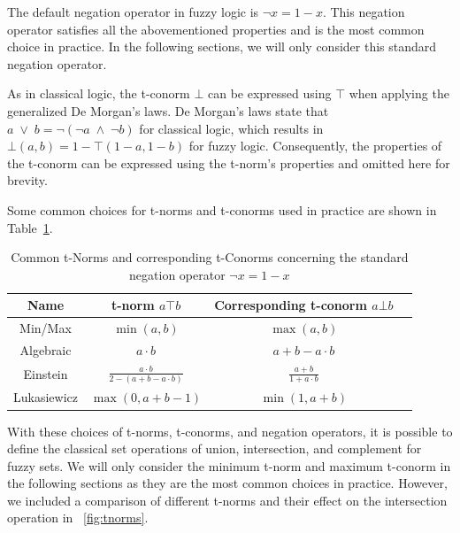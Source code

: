 The default negation operator in fuzzy logic is $\neg x = 1 - x$. This negation operator satisfies all the abovementioned properties and is the most common choice in practice. In the following sections, we will only consider this standard negation operator.

As in classical logic, the t-conorm $\bot$ can be expressed using $\top$ when applying the generalized De Morgan's laws. De Morgan's laws state that $a \; \lor \; b = \neg(\neg a \; \land \; \neg b)$ for classical logic, which results in $\bot(a, b) = 1 - \top(1 - a, 1 - b)$ for fuzzy logic. Consequently, the properties of the t-conorm can be expressed using the t-norm's properties and omitted here for brevity.


Some common choices for t-norms and t-conorms used in practice are shown in Table~\ref{tab:tnorms}.



\begin{table}[H]
      \centering
      {\renewcommand{\arraystretch}{1.2}
            \begin{tabular}{|c|c|c|c|}
                  \hline
                  Name        & t-norm   $a \top b$                         & Corresponding t-conorm      $a \bot b$ \\
                  \hline
                  Min/Max     & $\min(a, b)$                                & $\max(a, b)$                           \\
                  Algebraic   & $a \cdot b$                                 & $a + b - a \cdot b$                    \\
                  Einstein    & $\frac{a \cdot b}{2 - (a + b - a \cdot b)}$ & $\frac{a + b}{1 + a \cdot b}$          \\
                  Lukasiewicz & $\max(0, a + b - 1)$                        & $\min(1, a + b)$                       \\
                  \hline
            \end{tabular}
      }
      \caption{Common t-Norms and corresponding t-Conorms concerning the standard negation operator $\neg x = 1 - x$}
      \label{tab:tnorms}
\end{table}


With these choices of t-norms, t-conorms, and negation operators, it is possible to define the classical set operations of union, intersection, and complement for fuzzy sets. We will only consider the minimum t-norm and maximum t-conorm in the following sections as they are the most common choices in practice. However, we included a comparison of different t-norms and their effect on the intersection operation in ~\autoref{fig:tnorms}.

